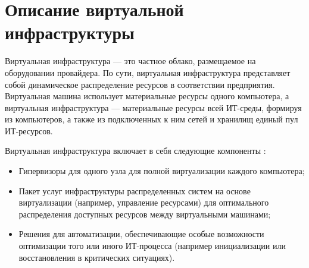 \section{Описание виртуальной инфраструктуры}

\iffalse 
Пункты:?
\begin{itemize}
  \item Назначение
  \item Системные требования, парк серверов
  \item Технологии, ПО, библиотеки, скрипты
  \item Алгоритмы (несколько, они довольно сложные) функционирования инфраструктуры 
\end{itemize}

Ключевые слова:
виртуализация,
KVM,
OpenVZ,
выделенный сервер,
VPS,
мониторинг,
nagios,
munin,
резервное копирование,
полный/инкрементальный/дифференциальный бэкапы,
репликация MySQL,
репликация DNS,
шардинг,
CDN,
балансировка нагрузки,
типы репликации DNS и MySQL,
DDoS и защита от него,
LVM,
RAID,
панель управления,
ISPmanager/Vesta/Plesk/cpanel/ajenti...,
ISPsystem и его продукция,
обоснование выбора OpenVZ и KVM,
работа с ДЦ,
лицензии на ПО и подсети IP с арендуемым железом,
биллинг (платежная система),
скрипты самопальные,
свои конфиги,
тестирование хостинг-панелей для клиентов,
клиентская и админская документация,
тарифы (услуги),
миграция контейнеров и серверов,
отказоустойчивость,
расширение инфраструктуры

Ссылки: http://blog.selectel.ru/balansirovka-nagruzki-osnovnye-algoritmy-i-metody/

Рисую в гугл драйве схемы.
\fi 

Виртуальная инфраструктура --- это частное облако, размещаемое на оборудовании провайдера.
По сути, виртуальная инфраструктура представляет собой динамическое распределение ресурсов в соответствии предприятия.
Виртуальная машина использует материальные ресурсы одного компьютера, а виртуальная инфраструктура --- материальные ресурсы всей ИТ-среды, формируя из компьютеров, а также из подключенных к ним сетей и хранилищ единый пул ИТ-ресурсов.

Виртуальная инфраструктура включает в себя следующие компоненты \cite{virt-infrast}:
\begin{itemize}
  \item Гипервизоры для одного узла для полной виртуализации каждого компьютера;
  \item Пакет услуг инфраструктуры распределенных систем на основе виртуализации (например, управление ресурсами) для оптимального распределения доступных ресурсов между виртуальными машинами;
  \item Решения для автоматизации, обеспечивающие особые возможности оптимизации того или иного ИТ-процесса (например инициализации или восстановления в критических ситуациях).
\end{itemize}

